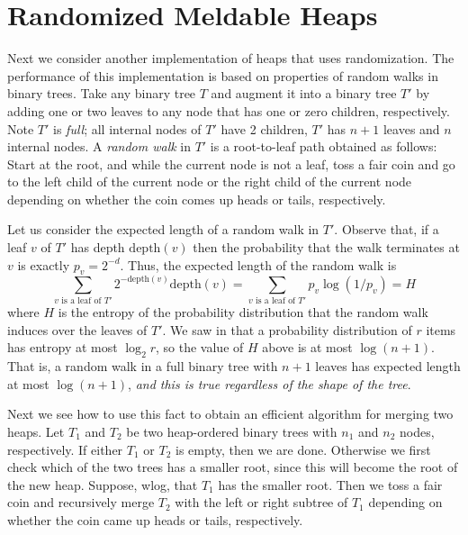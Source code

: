 \section{Randomized Meldable Heaps}

\newcommand{\depth}{\mathrm{depth}}

Next we consider another implementation of heaps that uses
randomization.  The performance of this implementation is based on
properties of random walks in binary trees.  Take any binary tree $T$
and augment it into a binary tree $T'$ by adding one or two leaves to
any node that has one or zero children, respectively.  Note $T'$ is
\emph{full}; all internal nodes of $T'$ have 2 children, $T'$ has
$n+1$ leaves and $n$ internal nodes.  A \emph{random walk} in $T'$ is
a root-to-leaf path obtained as follows: Start at the root, and while
the current node is not a leaf, toss a fair coin and go to the left
child of the current node or the right child of the current node
depending on whether the coin comes up heads or tails, respectively.

Let us consider the expected length of a random walk in $T'$.  Observe
that, if a leaf $v$ of $T'$ has depth $\depth(v)$ then the probability
that the walk terminates at $v$ is exactly $p_v = 2^{-d}$.  Thus, the
expected length of the random walk is
\[
   \sum_{\mbox{$v$ is a leaf of $T'$}} 2^{-\depth(v)}\depth(v)
     = \sum_{\mbox{$v$ is a leaf of $T'$}} p_v\log(1/p_v) = H 
\]  
where $H$ is the entropy of the probability distribution that the
random walk induces over the leaves of $T'$.  
We saw in  that a probability distribution of
$r$ items has entropy at most $\log_2 r$, so the value of $H$ above is
at most $\log(n+1)$.  That is, a random walk in a full binary tree
with $n+1$ leaves has expected length at most $\log(n+1)$, \emph{and
this is true regardless of the shape of the tree}.

Next we see how to use this fact to obtain an efficient algorithm for
merging two heaps.  Let $T_1$ and $T_2$ be two heap-ordered binary
trees with $n_1$ and $n_2$ nodes, respectively.  If either $T_1$ or
$T_2$ is empty, then we are done.  Otherwise we first check which of
the two trees has a smaller root, since this will become the root of
the new heap.  Suppose, wlog, that $T_1$ has the smaller root.  Then
we toss a fair coin and recursively merge $T_2$ with the left or right
subtree of $T_1$ depending on whether the coin came up heads or tails,
respectively.

